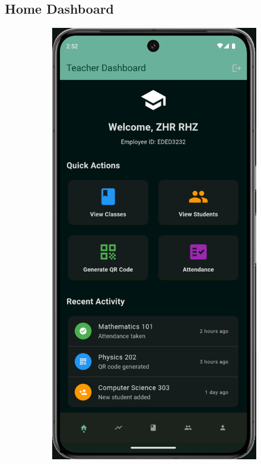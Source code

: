 \subsection{Home Dashboard}\nopagebreak[4]
\begin{figure}[H]
    \centering
    \begin{subfigure}[b]{0.35\textwidth}
        \includegraphics[width=\textwidth]{images/rachid/teacher-side-home.png}

\end{subfigure}
\end{figure}
